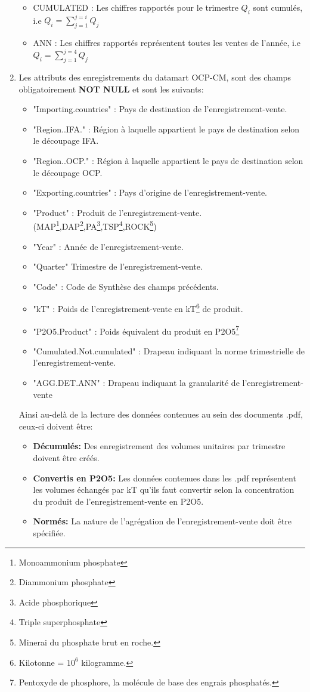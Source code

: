 \begin{enumerate}
\begin{itemize}
		\item CUMULATED : Les chiffres rapportés pour le trimestre ${Q_i}$ sont cumulés, i.e ${Q_i = \sum_{j=1}^{j=i} Q_j}$
		\item ANN : Les chiffres rapportés représentent toutes les ventes de l'année, i.e ${Q_i = \sum_{j=1}^{j=4} Q_j}$
		\end{itemize}
	\item Les attributs des enregistrements du datamart OCP-CM, sont des champs obligatoirement \textbf{NOT NULL} et sont les suivants:
	\begin{itemize}
	\item "Importing.countries" : Pays de destination de l'enregistrement-vente.
	\item "Region..IFA." : Région à laquelle appartient le pays de destination selon le découpage IFA.
	\item "Region..OCP." : Région à laquelle appartient le pays de destination selon le découpage OCP.
	\item "Exporting.countries" : Pays d'origine de l'enregistrement-vente.
	\item "Product" : Produit de l'enregistrement-vente. (MAP\footnote{Monoammonium phosphate},DAP\footnote{Diammonium phosphate},PA\footnote{Acide phosphorique},TSP\footnote{Triple superphosphate},ROCK\footnote{Minerai du phosphate brut en roche.})
	\item "Year" : Année de l'enregistrement-vente.
	\item "Quarter" Trimestre de l'enregistrement-vente.
	\item "Code" : Code de Synthèse des champs précédents.
	\item "kT" :  Poids de l'enregistrement-vente en kT\footnote{Kilotonne = $10^6$ kilogramme.} de produit.           
	\item "P2O5.Product" : Poids équivalent du produit en P2O5\footnote{Pentoxyde de phosphore, la molécule de base des engrais phosphatés.}
	\item "Cumulated.Not.cumulated" : Drapeau indiquant la norme trimestrielle de l'enregistrement-vente.
	\item "AGG.DET.ANN" : Drapeau indiquant la granularité de l'enregistrement-vente
	\end{itemize}
		Ainsi au-delà de la lecture des données contenues au sein des documents .pdf, ceux-ci doivent être:
		\begin{itemize}
		\item \textbf{Décumulés:} Des enregistrement des volumes unitaires par trimestre doivent être créés.
		\item \textbf{Convertis en P2O5:} Les données contenues dans les .pdf représentent les volumes échangés par kT qu'ils faut convertir selon la concentration du produit de l'enregistrement-vente en P2O5.
		\item \textbf{Normés:} La nature de l'agrégation de l'enregistrement-vente doit être spécifiée.
		\end{itemize}
	\end{enumerate}
